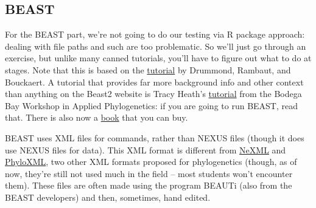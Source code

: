 \documentclass[]{article}
\begin{document}
\hypertarget{beast}{%
\subsection{BEAST}\label{beast}}

For the BEAST part, we're not going to do our testing via R package approach: dealing with file paths and such are too problematic. So we'll just go through an exercise, but unlike many canned tutorials, you'll have to figure out what to do at stages. Note that this is based on the \href{https://github.com/CompEvol/beast2/blob/master/doc/tutorials/DivergenceDating/DivergenceDatingTutorialv2.0.3.pdf?raw=true}{tutorial} by Drummond, Rambaut, and Bouckaert. A tutorial that provides far more background info and other context than anything on the Beast2 website is Tracy Heath's \href{http://phyloworks.org/workshops/DivTime_BEAST2_tutorial_FBD.pdf}{tutorial} from the Bodega Bay Workshop in Applied Phylogenetics: if you are going to run BEAST, read that. There is also now a \href{http://beast2.org/book/}{book} that you can buy.

BEAST uses XML files for commands, rather than NEXUS files (though it does use NEXUS files for data). This XML format is different from \href{http://www.nexml.org}{NeXML} and \href{http://www.phyloxml.org}{PhyloXML}, two other XML formats proposed for phylogenetics (though, as of now, they're still not used much in the field -- most students won't encounter them). These files are often made using the program BEAUTi (also from the BEAST developers) and then, sometimes, hand edited.
\end{document}
